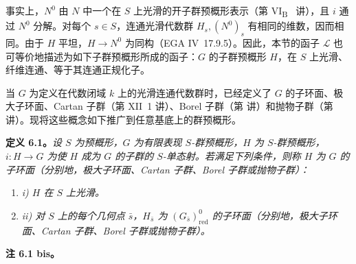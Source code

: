 
事实上，\(N^0\) 由 \(N\) 中一个在 \(S\) 上光滑的开子群预概形表示（第 VI\textsubscript{B}~ 讲），且 \(i\) 通过 \(N^0\) 分解。对每个 \(s\in S\)，连通光滑代数群 \(H_s,(N^0)_s\) 有相同的维数，因而相同。由于 \(H\) 平坦，\(H\to N^0\) 为同构（EGA IV~17.9.5）。因此，本节的函子 \(\mathcal L\) 也可等价地描述为如下子群预概形所成的函子：\(G\) 的子群预概形 \(H\)，在 \(S\) 上光滑、纤维连通、等于其连通正规化子。


当 \(G\) 为定义在代数闭域 \(k\) 上的光滑连通代数群时，已经定义了 \(G\) 的子环面、极大子环面、Cartan 子群（第 XII~1 讲）、Borel 子群（第  讲）和抛物子群（第  讲）。现将这些概念如下推广到任意基底上的群预概形。

\textbf{定义 6.1。}\emph{设 \(S\) 为预概形，\(G\) 为有限表现 \(S\)-群预概形，\(H\) 为 \(S\)-群预概形，\(i:H\to G\) 为使 \(H\) 成为 \(G\) 的子群的 \(S\)-单态射。若满足下列条件，则称 \(H\) 为 \(G\) 的子环面（分别地，极大子环面、Cartan 子群、Borel 子群或抛物子群）：}

\begin{enumerate}
\renewcommand{\labelenumi}{\textup{\roman{enumi})}}
\item
  \emph{i) \(H\) 在 \(S\) 上光滑。}
\item
  \emph{ii) 对 \(S\) 上的每个几何点 \(\bar s\)，\(H_{\bar s}\) 为 \((G_{\bar s})^{0}_{\mathrm{red}}\) 的子环面（分别地，极大子环面、Cartan 子群、Borel 子群或抛物子群）。}
\end{enumerate}

\textbf{注 6.1 bis。}

